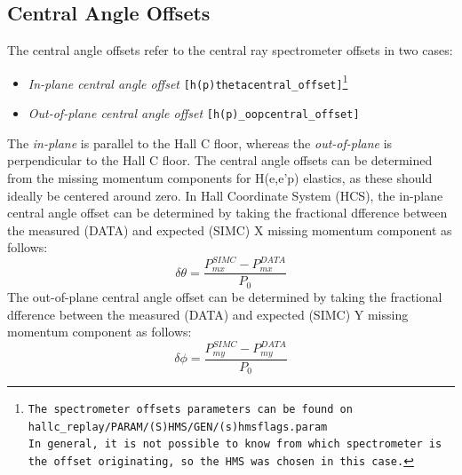 \documentclass[11pt]{article}
\begin{document}
\subsection{Central Angle Offsets}
\noindent The central angle offsets refer to the central ray spectrometer offsets in two cases:
\begin{itemize}
\item \textit{In-plane central angle offset} \texttt{[h(p)thetacentral\_offset]\footnote{The spectrometer offsets parameters can be found on \texttt{hallc\_replay/PARAM/(S)HMS/GEN/(s)hmsflags.param} \\ In general, it is not possible to know from which spectrometer is the offset originating, so the HMS was chosen in this case.}}
\item \textit{Out-of-plane central angle offset} \texttt{[h(p)\_oopcentral\_offset]}
\end{itemize}
The \textit{in-plane} is parallel to the Hall C floor, whereas the \textit{out-of-plane} is perpendicular to the Hall C floor.
The central angle offsets can be determined from the missing momentum components for H(e,e'p) elastics, as these should ideally be centered around
zero. In Hall Coordinate System (HCS), the in-plane central angle offset can be determined by taking the fractional dfference between
the measured (DATA) and expected (SIMC) X missing momentum component as follows:
\begin{equation}
  \delta \theta = \frac{P_{mx}^{SIMC} - P_{mx}^{DATA}}{P_{0}}
\end{equation}
The out-of-plane central angle offset can be determined by taking the fractional dfference between
the measured (DATA) and expected (SIMC) Y missing momentum component as follows:
\begin{equation}
  \delta \phi = \frac{P_{my}^{SIMC} - P_{my}^{DATA}}{P_{0}}
\end{equation}
\end{document}
